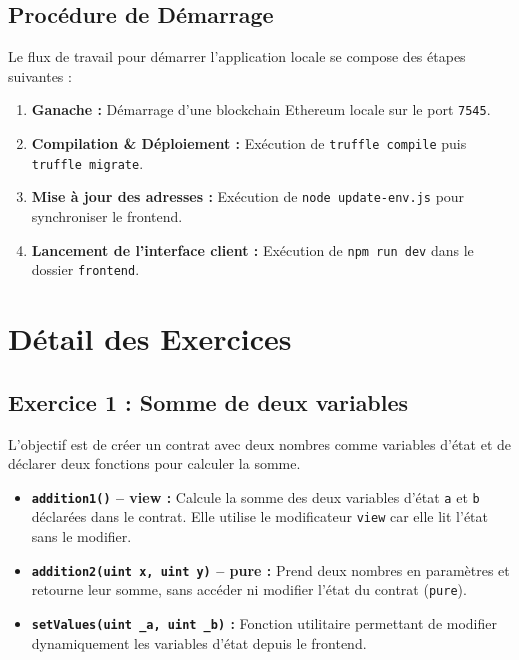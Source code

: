\documentclass[12pt,a4paper]{report}
\begin{document}
\section{Procédure de Démarrage}
Le flux de travail pour démarrer l'application locale se compose des étapes suivantes :
\begin{enumerate}
    \item \textbf{Ganache :} Démarrage d'une blockchain Ethereum locale sur le port \texttt{7545}.
    \item \textbf{Compilation \& Déploiement :} Exécution de \texttt{truffle compile} puis \texttt{truffle migrate}.
    \item \textbf{Mise à jour des adresses :} Exécution de \texttt{node update-env.js} pour synchroniser le frontend.
    \item \textbf{Lancement de l'interface client :} Exécution de \texttt{npm run dev} dans le dossier \texttt{frontend}.
\end{enumerate}

\newpage

\chapter{Détail des Exercices}

\section{Exercice 1 : Somme de deux variables}
L'objectif est de créer un contrat avec deux nombres comme variables d'état et de déclarer
deux fonctions pour calculer la somme.

\begin{itemize}
    \item \textbf{\texttt{addition1()} -- view :} Calcule la somme des deux variables d'état
          \texttt{a} et \texttt{b} déclarées dans le contrat. Elle utilise le modificateur
          \texttt{view} car elle lit l'état sans le modifier.
    \item \textbf{\texttt{addition2(uint x, uint y)} -- pure :} Prend deux nombres en paramètres
          et retourne leur somme, sans accéder ni modifier l'état du contrat (\texttt{pure}).
    \item \textbf{\texttt{setValues(uint \_a, uint \_b)} :} Fonction utilitaire permettant de
          modifier dynamiquement les variables d'état depuis le frontend.
\end{itemize}
\end{document}
